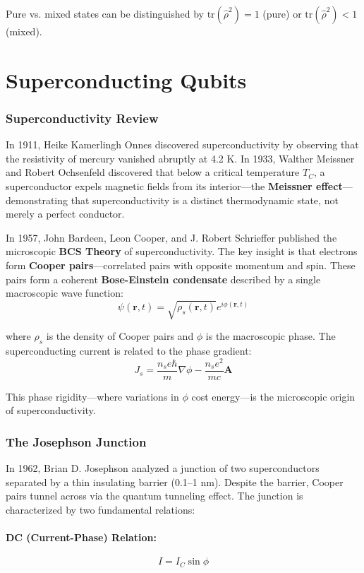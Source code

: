 \documentclass{article}
\begin{document}
Pure vs. mixed states can be distinguished by $\text{tr}(\hat{\rho}^2) = 1$ (pure) or $\text{tr}(\hat{\rho}^2) < 1$ (mixed).
\newpage
\section{Superconducting Qubits}
\subsubsection*{Superconductivity Review}

In 1911, Heike Kamerlingh Onnes discovered superconductivity by observing that the resistivity of mercury vanished abruptly at 4.2 K. In 1933, Walther Meissner and Robert Ochsenfeld discovered that below a critical temperature $T_C$, a superconductor expels magnetic fields from its interior—the \textbf{Meissner effect}—demonstrating that superconductivity is a distinct thermodynamic state, not merely a perfect conductor.

In 1957, John Bardeen, Leon Cooper, and J. Robert Schrieffer published the microscopic \textbf{BCS Theory} of superconductivity. The key insight is that electrons form \textbf{Cooper pairs}—correlated pairs with opposite momentum and spin. These pairs form a coherent \textbf{Bose-Einstein condensate} described by a single macroscopic wave function:
$$\psi(\mathbf{r}, t) = \sqrt{\rho_s(\mathbf{r}, t)} e^{i\phi(\mathbf{r}, t)}$$

where $\rho_s$ is the density of Cooper pairs and $\phi$ is the macroscopic phase. The superconducting current is related to the phase gradient:
$$J_s = \frac{n_s e \hbar}{m} \nabla\phi - \frac{n_s e^2}{m c} \mathbf{A}$$

This phase rigidity—where variations in $\phi$ cost energy—is the microscopic origin of superconductivity.

\subsubsection*{The Josephson Junction}

In 1962, Brian D. Josephson analyzed a junction of two superconductors separated by a thin insulating barrier (0.1–1 nm). Despite the barrier, Cooper pairs tunnel across via the quantum tunneling effect. The junction is characterized by two fundamental relations:

\paragraph{DC (Current-Phase) Relation:}
$$I = I_C \sin \phi$$
\end{document}
